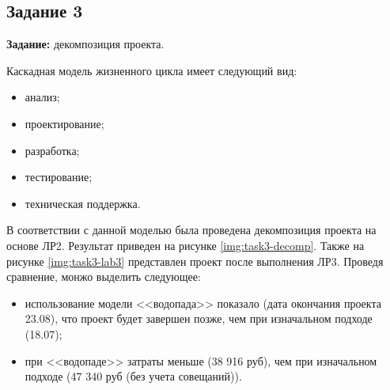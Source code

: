 

\clearpage
\subsection{Задание 3}

\textbf{Задание:} декомпозиция проекта.

Каскадная модель жизненного цикла имеет следующий вид:

\begin{itemize}
    \item анализ;
    \item проектирование;
    \item разработка;
    \item тестирование;
    \item техническая поддержка.
\end{itemize}

В соответствии с данной моделью была проведена декомпозиция проекта на основе ЛР2. Результат приведен на рисунке \ref{img:task3-decomp}. Также на рисунке \ref{img:task3-lab3} представлен проект после выполнения ЛР3. Проведя сравнение, монжо выделить следующее:

\begin{itemize}
    \item использование модели <<водопада>> показало (дата окончания проекта 23.08), что проект будет завершен позже, чем при изначальном подходе (18.07);
    \item при <<водопаде>> затраты меньше (38 916 руб), чем при изначальном подходе (47 340 руб (без учета совещаний)).
\end{itemize}

